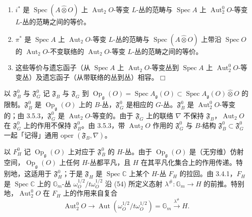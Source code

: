 \begin{enumerate}[label=\arabic*),leftmargin=2.2em]
\item $i^{*}$ 是 $\operatorname{Spec}(A\widehat\otimes O)$ 上 $\operatorname{Aut}_{2}O$-等变 $L$-丛的范畴与 $\operatorname{Spec}A$ 上 $\operatorname{Aut}_{2}^{0}O$-等变 $L$-丛的范畴之间的等价。
\item $\pi^{*}$ 是 $\operatorname{Spec}A$ 上 $\operatorname{Aut}_{2}O$-等变 $L$-丛的范畴与 $\operatorname{Spec}(A\widehat\otimes O)$ 上带沿 $\operatorname{Spec}O$ 的 $\operatorname{Aut}_{2}O$-不变联络的 $\operatorname{Aut}_{2}O$-等变 $L$-丛的范畴之间的等价。
\item 这些等价与遗忘函子（从 $\operatorname{Spec}A$ 上 $\operatorname{Aut}_{2}O$-等变丛到 $\operatorname{Spec}A$ 上 $\operatorname{Aut}_{2}^{0}O$-等变丛）及遗忘函子（从带联络的丛到丛）相容。\hfill$\Box$
\end{enumerate}

 以 $\mathfrak{F}^{0}_{B}$ 与 $\mathfrak{F}^{0}_{G}$ 记 $\mathfrak{F}_{B}$ 与 $\mathfrak{F}_{G}$ 到 $\operatorname{Op}_{\mathfrak{g}}(O)=\operatorname{Spec}A_{\mathfrak{g}}(O)\subset\operatorname{Spec}A_{\mathfrak{g}}(O)\widehat\otimes O$ 的限制。$\mathfrak{F}^{0}_{B}$ 是 $\operatorname{Op}_{\mathfrak{g}}(O)$ 上的 $B$-丛，$\mathfrak{F}^{0}_{G}$ 是相应的 $G$-丛。$\mathfrak{F}^{0}_{B}$ 是 $\operatorname{Aut}_{2}^{0}O$-等变的；由 3.5.3，$\mathfrak{F}^{0}_{G}$ 是 $\operatorname{Aut}_{2}O$-等变的。由于 $\mathfrak{F}_{G}$ 上的联络 $\nabla$ 不保持 $\mathfrak{F}_{B}$，$\operatorname{Aut}_{2}O$ 在 $\mathfrak{F}^{0}_{G}$ 上的作用不保持 $\mathfrak{F}^{0}_{B}$。由 3.5.3，带 $\operatorname{Aut}_{2}O$ 作用的 $\mathfrak{F}^{0}_{G}$ 与 $B$-结构 $\mathfrak{F}^{0}_{B}\subset\mathfrak{F}^{0}_{G}$ 一起「记得」通用 oper $(\mathfrak{F}_{B},\nabla)$。

 以 $F^{0}_{H}$ 记 $\operatorname{Op}_{\mathfrak{g}}(O)$ 上对应于 $\mathfrak{F}^{0}_{B}$ 的 $H$-丛。由于 $\operatorname{Op}_{\mathfrak{g}}(O)$ 是（无穷维）仿射空间，$\operatorname{Op}_{\mathfrak{g}}(O)$ 上任何 $H$-丛都平凡，且 $H$ 在其平凡化集合上的作用传递。特别地，这适用于 $\mathfrak{F}^{0}_{H}$；于是 $\mathfrak{F}_{H}$ 是 $\operatorname{Spec}\mathbb{C}$ 上某个 $H$-丛 $F_{H}$ 的拉回。由 3.4.1，$F_{H}$ 是 $\operatorname{Spec}\mathbb{C}$ 上的 $\mathbb{G}_{m}$-丛 $\omega_{O}^{1/2}/t\omega_{O}^{1/2}$ 沿 (54) 所定义态射 $\lambda^{\#}:\mathbb{G}_{m}\to H$ 的前推。特别地，$\operatorname{Aut}_{2}^{0}O$ 在 $F_{H}$ 上的作用来自复合
\[
\operatorname{Aut}_{2}^{0}O\to\operatorname{Aut}(\omega_{O}^{1/2}/t\omega_{O}^{1/2})=\mathbb{G}_{m}\xrightarrow{\lambda^{\#}}H.
\]

